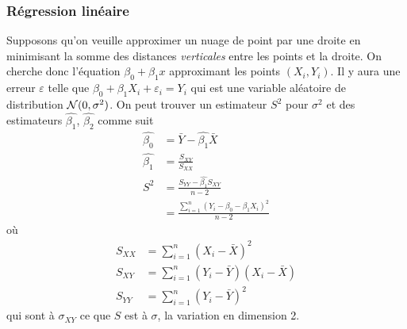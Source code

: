 \subsubsection{Régression linéaire}
Supposons qu'on veuille approximer un nuage de point par une droite en minimisant la somme des distances
\emph{verticales} entre les points et la droite.
On cherche donc l'équation $\beta_0 + \beta_1x$ approximant les points $(X_i, Y_i)$.
Il y aura une erreur $\varepsilon$ telle que $\beta_0 + \beta_1 X_i + \varepsilon_i = Y_i$
qui est une variable aléatoire de distribution $\mathcal{N}(0, \sigma^2)$.
On peut trouver un estimateur $S^2$ pour $\sigma^2$ et des estimateurs $\hat{\beta_1}$, $\hat{\beta_2}$ comme suit
\begin{align*}
  \hat{\beta_0} & = \bar{Y} - \hat{\beta_1}\bar{X}\\
  \hat{\beta_1} & = \frac{S_{XY}}{S_{XX}}\\
  S^2 & = \frac{S_{YY} - \hat{\beta_1}S_{XY}}{n-2}\\
      & = \frac{\sum_{i=1}^n (Y_i - \beta_0 - \beta_1 X_i)^2}{n-2}
\end{align*}
où
\begin{align*}
  S_{XX} & = \sum_{i=1}^n (X_i - \bar{X})^2\\
  S_{XY} & = \sum_{i=1}^n (Y_i - \bar{Y})(X_i - \bar{X})\\
  S_{YY} & = \sum_{i=1}^n (Y_i - \bar{Y})^2
\end{align*}
qui sont à $\sigma_{XY}$ ce que $S$ est à $\sigma$, la variation en dimension 2.

\biblio



